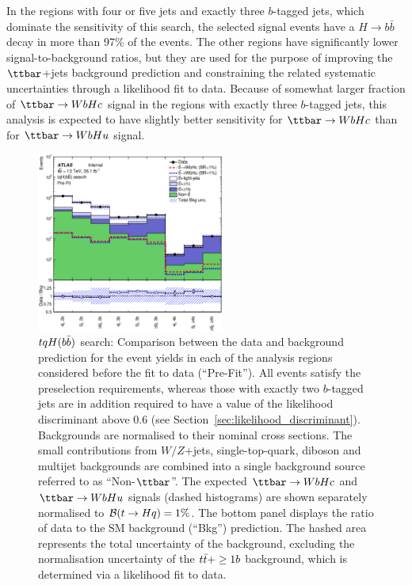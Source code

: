 In the regions with four or five jets and exactly three $b$-tagged jets, which dominate the sensitivity of this search, 
the selected signal events have a $H \to b\bar{b}$ decay in more than 97\% of the events.
The other regions have significantly lower signal-to-background ratios, but they are used for the purpose of improving 
the $\ttbar$+jets background prediction and constraining the related systematic uncertainties
through a likelihood fit to data.  
Because of somewhat larger fraction of $\Hc$ signal in the regions with exactly three $b$-tagged jets,
this analysis is expected to have slightly better sensitivity for $\Hc$ than for $\Hu$ signal.

\begin{figure}[t]
\begin{center}
\includegraphics[width=0.55\textwidth]{figures/Hbb/fit/cH_plots/Summary.eps}
\caption{$tqH(b\bar{b})$ search: Comparison between the data and background prediction for the event yields in each of the analysis regions considered 
before the fit to data (``Pre-Fit''). All events satisfy the preselection requirements, whereas those with exactly two $b$-tagged jets are
in addition required to have a value of the likelihood discriminant above 0.6 (see Section~\ref{sec:likelihood_discriminant}).
Backgrounds are normalised to their nominal cross sections.
The small contributions from $W/Z$+jets,  single-top-quark, diboson and multijet backgrounds are combined into a single background source 
referred to as ``Non-$\ttbar$''. 
The expected $\Hc$ and $\Hu$ signals (dashed histograms) are shown separately normalised to $\mathcal{B}(t\to Hq)=1\%$.
The bottom panel displays the ratio of data to the SM background (``Bkg'') prediction. 
The hashed area represents the total uncertainty of the background, excluding the normalisation uncertainty of the $t\bar{t}+\geq1b$ background, 
which is determined via a likelihood fit to data.} 
\label{fig:Hbb_Summary}
\end{center}
\end{figure}


